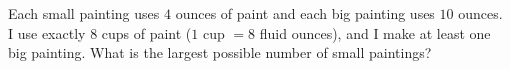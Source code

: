 Each small painting uses $4$ ounces of paint and each big painting uses $10$ ounces. I use exactly $8$ cups of paint ($1$ cup $=8$ fluid ounces), and I make at least one big painting. What is the largest possible number of small paintings?
